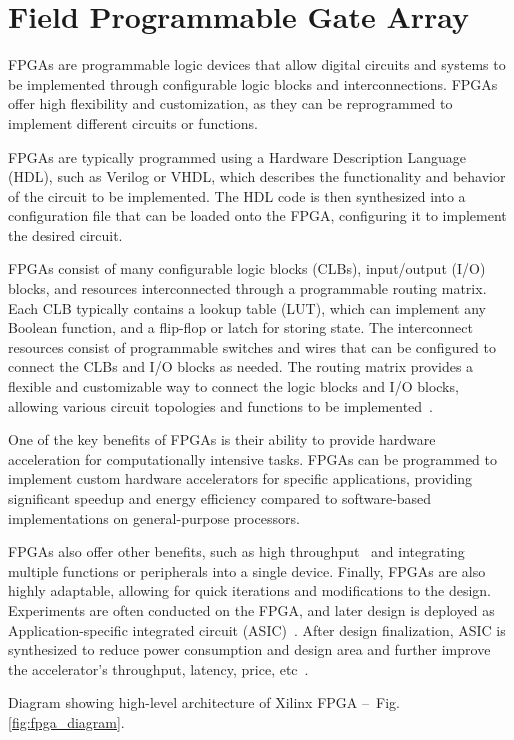 \section{Field Programmable Gate Array}
FPGAs are programmable logic devices that allow digital circuits and systems to be implemented through configurable logic blocks and interconnections. FPGAs offer high flexibility and customization, as they can be reprogrammed to implement different circuits or functions.

FPGAs are typically programmed using a Hardware Description Language (HDL), such as Verilog or VHDL, which describes the functionality and behavior of the circuit to be implemented. The HDL code is then synthesized into a configuration file that can be loaded onto the FPGA, configuring it to implement the desired circuit. 

FPGAs consist of many configurable logic blocks (CLBs), input/output (I/O) blocks, and resources interconnected through a programmable routing matrix. Each CLB typically contains a lookup table (LUT), which can implement any Boolean function, and a flip-flop or latch for storing state. The interconnect resources consist of programmable switches and wires that can be configured to connect the CLBs and I/O blocks as needed. The routing matrix provides a flexible and customizable way to connect the logic blocks and I/O blocks, allowing various circuit topologies and functions to be implemented~\cite{fpga_architecture}.

One of the key benefits of FPGAs is their ability to provide hardware acceleration for computationally intensive tasks. FPGAs can be programmed to implement custom hardware accelerators for specific applications, providing significant speedup and energy efficiency compared to software-based implementations on general-purpose processors.~\cite{cpu_vs_gpu_vs_fpga}

FPGAs also offer other benefits, such as high throughput~\cite{fpga_high_throughput} and integrating multiple functions or peripherals into a single device. Finally, FPGAs are also highly adaptable, allowing for quick iterations and modifications to the design. Experiments are often conducted on the FPGA, and later design is deployed as Application-specific integrated circuit (ASIC)~\cite{fpga_to_asic}. After design finalization, ASIC is synthesized to reduce power consumption and design area and further improve the accelerator's throughput, latency, price, etc~\cite{fpga_vs_asic}. 

Diagram showing high-level architecture of Xilinx FPGA --~Fig.\ref{fig:fpga_diagram}.

